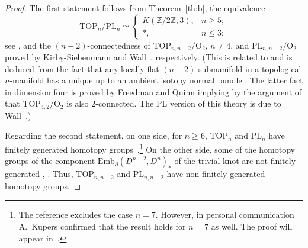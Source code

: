 \documentclass[11pt]{amsart}
\theoremstyle{definition}
\newcommand{\Z}{{\mathbb Z}}
\newcommand{\Emb}{\mathrm{Emb}}
\newcommand{\PL}{\mathrm{PL}}
\newcommand{\TOP}{\mathrm{TOP}}
\newcommand{\OO}{\mathrm{O}}
\numberwithin{equation}{section}
\begin{document}
\begin{proof}
The first statement follows from Theorem~\ref{th:b}, the equivalence
\begin{equation}\label{eq:KS}
\TOP_n/\PL_n
\simeq\begin{cases} K(\Z/2\Z,3),& n\geq 5;\\
*,& n\leq 3;
\end{cases}
\end{equation}
 see \cite[Essay~V, \S5, Subsection~5.0]{KS_essays}, and the $(n-2)$-connectedness of $\TOP_{n,n-2}/\OO_2$, $n\neq 4$, and  $\PL_{n,n-2}/\OO_2$ proved by Kirby-Siebenmann \cite[Theorem~B]{KS_codim2}
 and Wall~\cite[Lemma~5]{Wall_codim2}, respectively. 
  (This is related to and is deduced from the fact that any locally flat 
$(n-2)$-submanifold in a topological $n$-manifold has a unique up to an ambient isotopy normal bundle \cite[Theorem~A]{KS_codim2}. The latter fact in dimension four is proved
by Freedman and Quinn \cite[Section~9.3]{FQ} implying by the argument of \cite[Proof of Theorem~B]{KS_codim2} that $\TOP_{4,2}/\OO_2$ is also 2-connected. The PL version of this theory is due
to Wall~\cite{Wall_codim2}.)


Regarding the second statement, on one side, for $n\geq 6$, $\TOP_n$ and $\PL_n$ have finitely generated homotopy groups~\cite{Kupers}.\footnote{The reference excludes the case $n=7$. However, in personal communication A.~Kupers confirmed that the result holds for $n=7$ as well. The proof will appear in~\cite{KraKup}.} On the other side, some of the homotopy groups of the component  $\Emb_\partial(D^{n-2},D^n)_*$  of the trivial knot
are not finitely generated \cite{BG2,BG1}, \cite[Example~7.3]{BKK}. Thus,  $\TOP_{n,n-2}$ and $\PL_{n,n-2}$ have non-finitely generated homotopy groups.


\end{proof}
\end{document}
